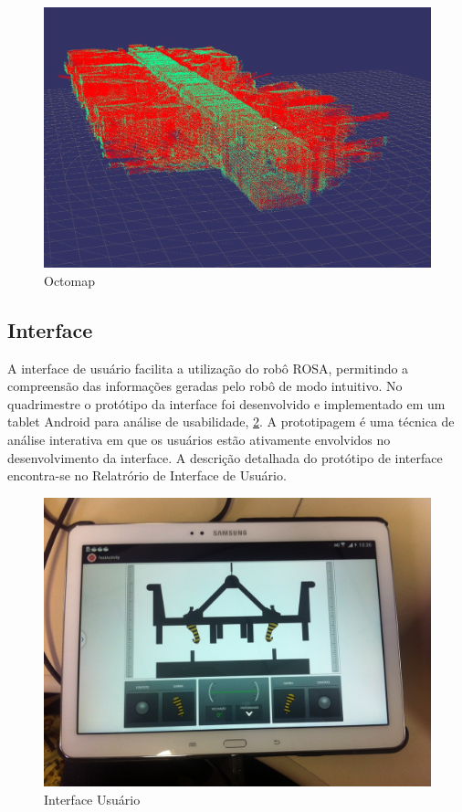 \begin{figure}[ht!]
    \centering \includegraphics[width=1\columnwidth]{figs/resultados/octomap}
    \caption{Octomap}
    \label{fig:octomap}
\end{figure}

\noindent
\subsection{Interface}

A interface de usuário facilita a utilização do robô ROSA, permitindo a compreensão das informações geradas pelo robô de modo intuitivo. 
No quadrimestre o protótipo da interface foi desenvolvido e implementado em um tablet Android para análise de usabilidade, \ref{fig:userinterface}.   
A prototipagem é uma técnica de análise interativa em que os usuários estão ativamente envolvidos no desenvolvimento da interface. 
A descrição detalhada do protótipo de interface encontra-se no Relatrório de Interface de Usuário.

\begin{figure}[ht!]
    \centering \includegraphics[width=1\columnwidth]{figs/resultados/UI}
    \caption{Interface Usuário}
    \label{fig:userinterface}
\end{figure}


